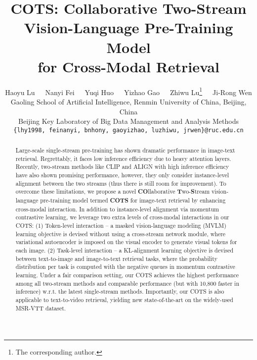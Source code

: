 \documentclass[10pt,twocolumn,letterpaper]{article}
\begin{document}
\title{COTS: Collaborative Two-Stream Vision-Language Pre-Training Model \\for Cross-Modal Retrieval}



\author{Haoyu Lu~~~Nanyi Fei~~~Yuqi Huo~~~Yizhao Gao~~~Zhiwu Lu\thanks{The corresponding author.}~~~Ji-Rong Wen\\
Gaoling School of Artificial Intelligence, Renmin University of China, Beijing, China\\
Beijing Key Laboratory of Big Data Management and Analysis Methods\\
{\tt\small \{lhy1998,~feinanyi,~bnhony,~gaoyizhao,~luzhiwu,~jrwen\}@ruc.edu.cn}
}

\maketitle

\begin{abstract}
   Large-scale single-stream pre-training has shown dramatic performance in image-text retrieval. Regrettably, it faces low inference efficiency due to heavy attention layers. Recently, two-stream methods like CLIP and ALIGN with high inference efficiency have also shown promising performance, however, they only consider instance-level alignment between the two streams (thus there is still room for improvement). To overcome these limitations, we propose a novel \textbf{CO}llaborative \textbf{T}wo-\textbf{S}tream vision-language pre-training model termed \textbf{COTS} for image-text retrieval by enhancing cross-modal interaction. In addition to instance-level alignment via momentum contrastive learning, we leverage two extra levels of cross-modal interactions in our COTS: (1) Token-level interaction -- a masked vision-language modeling (MVLM) learning objective is devised without using a cross-stream network module, where variational autoencoder is imposed on the visual encoder to generate visual tokens for each image. (2) Task-level interaction -- a KL-alignment learning objective is devised between text-to-image and image-to-text retrieval tasks, where the probability distribution per task is computed with the negative queues in momentum contrastive learning. Under a fair comparison setting, our COTS achieves the highest performance among all two-stream methods and comparable performance (but with 10,800 faster in inference) w.r.t. the latest single-stream methods. Importantly, our COTS is also applicable to text-to-video retrieval, yielding new state-of-the-art on the widely-used MSR-VTT dataset. 
\end{abstract}
\end{document}
